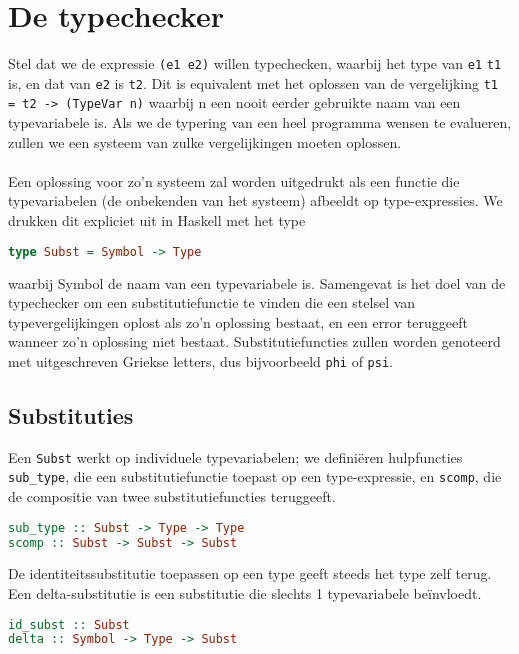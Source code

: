 \documentclass[a4paper,10pt]{article}
\begin{document}
\section{De typechecker}
Stel dat we de expressie \texttt{(e1 e2)} willen typechecken, waarbij het type van \texttt{e1} \texttt{t1} is, en dat van \texttt{e2} is \texttt{t2}.
Dit is equivalent met het oplossen van de vergelijking \texttt{t1 = t2 -> (TypeVar n)} waarbij n een nooit eerder gebruikte naam van een typevariabele is.
Als we de typering van een heel programma wensen te evalueren, zullen we een systeem van zulke vergelijkingen moeten oplossen.
\paragraph{}
Een oplossing voor zo'n systeem zal worden uitgedrukt als een functie die typevariabelen (de onbekenden van het systeem) afbeeldt op type-expressies.
We drukken dit expliciet uit in Haskell met het type
\begin{lstlisting}[language=Haskell,frame=single]
type Subst = Symbol -> Type
\end{lstlisting}
waarbij Symbol de naam van een typevariabele is.
Samengevat is het doel van de typechecker om een substitutiefunctie te vinden die een stelsel van typevergelijkingen oplost als zo'n oplossing bestaat, en een error teruggeeft wanneer zo'n oplossing niet bestaat.
Substitutiefuncties zullen worden genoteerd met uitgeschreven Griekse letters, dus bijvoorbeeld \texttt{phi} of \texttt{psi}.

\subsection{Substituties}
Een \texttt{Subst} werkt op individuele typevariabelen; we defini{\"e}ren hulpfuncties \texttt{sub\_type}, die een substitutiefunctie toepast op een type-expressie, en \texttt{scomp}, die de compositie van twee substitutiefuncties teruggeeft.
\begin{lstlisting}[language=Haskell,frame=single]
sub_type :: Subst -> Type -> Type
scomp :: Subst -> Subst -> Subst
\end{lstlisting}
De identiteitssubstitutie toepassen op een type geeft steeds het type zelf terug.
Een delta-substitutie is een substitutie die slechts 1 typevariabele be{\"i}nvloedt.
\begin{lstlisting}[language=Haskell,frame=single]
id_subst :: Subst
delta :: Symbol -> Type -> Subst
\end{lstlisting}
\end{document}
